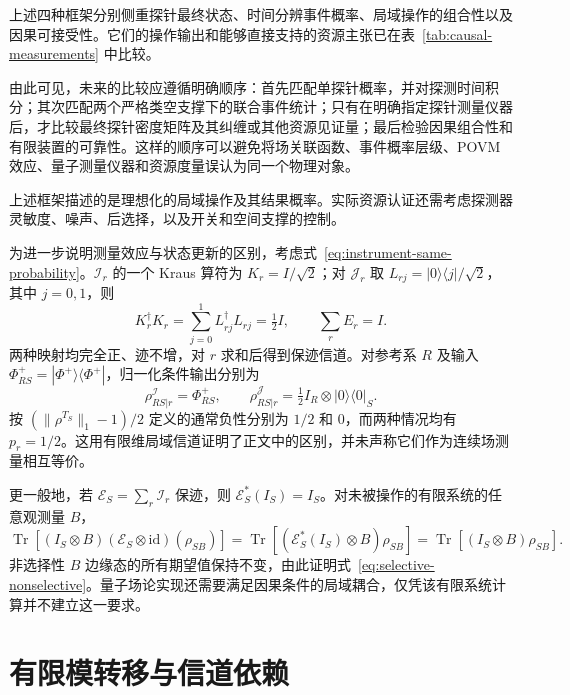 \documentclass[UTF8,11pt,a4paper,fontset=none]{ctexart}
\newcommand{\Tr}{\operatorname{Tr}}
\begin{document}
上述四种框架分别侧重探针最终状态、时间分辨事件概率、局域操作的组合性以及因果可接受性。它们的操作输出和能够直接支持的资源主张已在表~\ref{tab:causal-measurements} 中比较。

由此可见，未来的比较应遵循明确顺序：首先匹配单探针概率，并对探测时间积分；其次匹配两个严格类空支撑下的联合事件统计；只有在明确指定探针测量仪器后，才比较最终探针密度矩阵及其纠缠或其他资源见证量；最后检验因果组合性和有限装置的可靠性。这样的顺序可以避免将场关联函数、事件概率层级、POVM 效应、量子测量仪器和资源度量误认为同一个物理对象。


上述框架描述的是理想化的局域操作及其结果概率。实际资源认证还需考虑探测器灵敏度、噪声、后选择，以及开关和空间支撑的控制。




为进一步说明测量效应与状态更新的区别，考虑式~\eqref{eq:instrument-same-probability}。$\mathcal I_r$ 的一个 Kraus 算符为 $K_r=I/\sqrt2$；对 $\mathcal J_r$ 取 $L_{rj}=|0\rangle\langle j|/\sqrt2$，其中 $j=0,1$，则
\begin{equation}
K_r^\dagger K_r=\sum_{j=0}^1L_{rj}^\dagger L_{rj}=\tfrac12I,
\qquad \sum_r E_r=I.
\end{equation}
两种映射均完全正、迹不增，对 $r$ 求和后得到保迹信道。对参考系 $R$ 及输入 $\Phi^+_{RS}=|\Phi^+\rangle\langle\Phi^+|$，归一化条件输出分别为
\begin{equation}
\rho^{\mathcal I}_{RS|r}=\Phi^+_{RS},\qquad
\rho^{\mathcal J}_{RS|r}=\tfrac12 I_R\otimes|0\rangle\langle0|_S.
\end{equation}
按 $(\|\rho^{T_S}\|_1-1)/2$ 定义的通常负性分别为 $1/2$ 和 $0$，而两种情况均有 $p_r=1/2$。这用有限维局域信道证明了正文中的区别，并未声称它们作为连续场测量相互等价。

更一般地，若 $\mathcal E_S=\sum_r\mathcal I_r$ 保迹，则 $\mathcal E_S^*(I_S)=I_S$。对未被操作的有限系统的任意观测量 $B$，
\begin{equation}
\Tr[(I_S\otimes B)(\mathcal E_S\otimes\mathrm{id})(\rho_{SB})]
=\Tr[(\mathcal E_S^*(I_S)\otimes B)\rho_{SB}]
=\Tr[(I_S\otimes B)\rho_{SB}].
\end{equation}
非选择性 $B$ 边缘态的所有期望值保持不变，由此证明式~\eqref{eq:selective-nonselective}。量子场论实现还需要满足因果条件的局域耦合，仅凭该有限系统计算并不建立这一要求。



\section{有限模转移与信道依赖}
\label{app:finite-mode-transfer}
\end{document}
